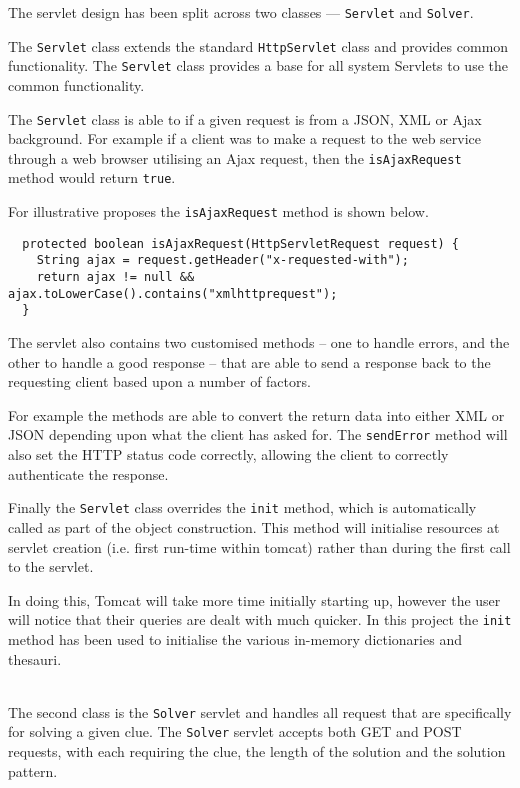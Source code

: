 The servlet design has been split across two classes --- \texttt{Servlet} and 
\texttt{Solver}.

The \texttt{Servlet} class extends the standard \texttt{HttpServlet} class and
provides common functionality. The \texttt{Servlet} class provides a base for 
all system Servlets to use the common functionality.

The \texttt{Servlet} class is able to if a given request is from a JSON, XML or 
Ajax background. For example if a client was to make a request to the web 
service through a web browser utilising an Ajax request, then the 
\texttt{isAjaxRequest}  method would return \texttt{true}.

For illustrative proposes the \texttt{isAjaxRequest} method is shown below.

\begin{verbatim}
  protected boolean isAjaxRequest(HttpServletRequest request) {
    String ajax = request.getHeader("x-requested-with");
    return ajax != null && ajax.toLowerCase().contains("xmlhttprequest");
  }
\end{verbatim}

The servlet also contains two customised methods -- one to handle errors, and 
the other to handle a good response -- that are able to send a response back to 
the requesting client based upon a number of factors.

For example the methods are able to convert the return data into either XML or 
JSON depending upon what the client has asked for. The \texttt{sendError} method
will also set the HTTP status code correctly, allowing the client to correctly 
authenticate the response.

Finally the \texttt{Servlet} class overrides the \texttt{init} method, which 
is automatically called as part of the object construction. This method will 
initialise resources at servlet creation (i.e. first run-time within tomcat) 
rather than during the first call to the servlet. 

In doing this, Tomcat will take more time initially starting up, however the 
user will notice that their queries are dealt with much quicker. In this project
the \texttt{init} method has been used to initialise the various in-memory 
dictionaries and thesauri.

~\\

The second class is the \texttt{Solver} servlet and handles all request that are
specifically for solving a given clue. The \texttt{Solver} servlet accepts both
GET and POST requests, with each requiring the clue, the length of the solution
and the solution pattern.

